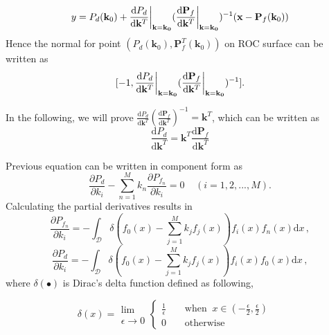 \begin{equation}
\label{pro : y2}
y = P_d(\mathbf{k}_0) + \frac{\mathrm{d}P_d}{\mathrm{d}\mathbf{k}^T}\bigg{|}_{\mathbf{k}=\mathbf{k_0}}(
\frac{\mathrm{d}\mathbf{P}_f}{\mathrm{d}\mathbf{k}^T}\bigg{|}_{\mathbf{k}=\mathbf{k_0}}
)^{-1} (\mathbf{x} - \mathbf{P}_f(\mathbf{k}_0))
\end{equation}
Hence the normal for point $(P_d(\mathbf{k}_0), \mathbf{P}_f^T(\mathbf{k}_0))$ on ROC surface can be written as
\begin{equation}
\label{vec: normal}
[-1, \frac{\mathrm{d}P_d}{\mathrm{d}\mathbf{k}^T}\bigg{|}_{\mathbf{k}=\mathbf{k_0}}(
\frac{\mathrm{d}\mathbf{P}_f}{\mathrm{d}\mathbf{k}^T}\bigg{|}_{\mathbf{k}=\mathbf{k_0}}
)^{-1}
].
\end{equation}

In the following, we will prove $ \frac{\mathrm{d}P_d}{\mathrm{d}\mathbf{k}^T}(
\frac{\mathrm{d}\mathbf{P}_f}{\mathrm{d}\mathbf{k}^T}
)^{-1} = \mathbf{k}^T
$, which can be written as
\begin{equation}
\label{pro: vec}
\frac{\mathrm{d}P_d}{\mathrm{d}\mathbf{k}^T} = \mathbf{k}^T \frac{\mathrm{d}\mathbf{P}_f}{\mathrm{d}\mathbf{k}^T}
\end{equation}

Previous equation can be written in component form as
\begin{equation}
\label{pro: component}
\frac{\partial P_d}{\partial k_i} - \sum_{n=1}^{M}k_n\frac{\partial P_{f_n}}{\partial k_i} = 0 \;\;\;\;(i=1, 2, ..., M).
\end{equation}
Calculating the  partial derivatives results in
\begin{equation}
\label{pro: Pf par k}
\frac{\partial P_{f_n}}{ \partial k_i} = - \int_{\mathcal{D}}\delta (f_0(x) - \sum_{j=1}^{M}k_jf_j(x))f_i(x)f_n(x) \mathrm{d}x\,,
\end{equation}
\label{pro: Pd par k}
\begin{equation}\frac{\partial P_d}{ \partial k_i} = - \int_{\mathcal{D}}\delta (f_0(x) - \sum_{j=1}^{M}k_jf_j(x))f_i(x)f_0(x) \mathrm{d}x\,,
\end{equation}
where $\delta(\bullet)$ is Dirac's delta function defined as following,

\begin{equation}
\label{pro: delta}
\delta(x) = \substack{\lim \\ \epsilon \rightarrow 0} \begin{cases}
\frac{1}{\epsilon}\;\;\;\;&\text{when} \;\;x \in (-\frac{\epsilon}{2}, \frac{\epsilon}{2})\\
0\;\;\;\;&\text{otherwise}
\end{cases} \;\;\;\;
\end{equation}

